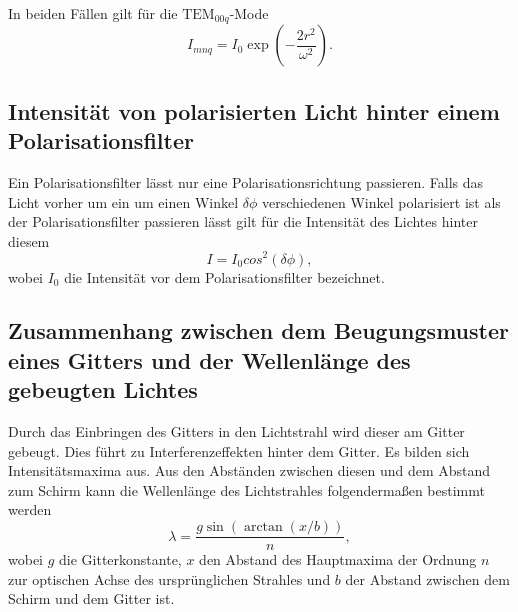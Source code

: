 In beiden Fällen gilt für die $\text{TEM}_{00q}$-Mode
\begin{equation}
I_{mnq} = I_0 \exp\left(-\frac{2 r^2}{\omega ^2}\right). \label{eq:gaus}
\end{equation}

\subsection{Intensität von polarisierten Licht hinter einem Polarisationsfilter}
Ein Polarisationsfilter lässt nur eine Polarisationsrichtung passieren. Falls das Licht vorher um ein um einen Winkel $\delta\phi$ verschiedenen Winkel polarisiert ist als der Polarisationsfilter passieren lässt gilt für die Intensität des Lichtes hinter diesem
\begin{equation}
	I=I_0 cos^2(\delta\phi), \label{eq:polar}
\end{equation}
wobei $I_0$ die Intensität vor dem Polarisationsfilter bezeichnet.

\subsection{Zusammenhang zwischen dem Beugungsmuster eines Gitters und der Wellenlänge des gebeugten Lichtes}
Durch das Einbringen des Gitters in den Lichtstrahl wird dieser am Gitter gebeugt. Dies führt zu Interferenzeffekten hinter dem Gitter. Es bilden sich Intensitätsmaxima aus. Aus den Abständen zwischen diesen und dem Abstand zum Schirm kann die Wellenlänge des Lichtstrahles folgendermaßen bestimmt werden
\begin{equation}
	\lambda = \frac{g \sin(\arctan(x/b))}{n}, \label{eq:lambda}
\end{equation}
wobei $g$ die Gitterkonstante, $x$ den Abstand des Hauptmaxima der Ordnung $n$ zur optischen Achse des ursprünglichen Strahles und $b$ der Abstand zwischen dem Schirm und dem Gitter ist.



